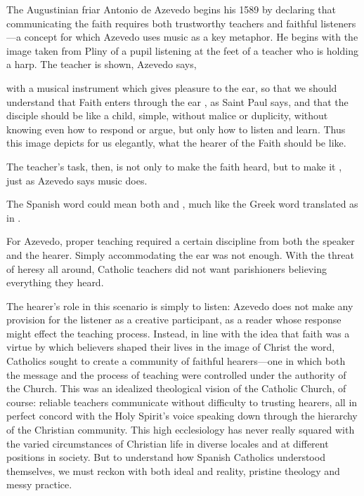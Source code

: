 The Augustinian friar Antonio de Azevedo begins his 1589  by declaring that communicating the faith requires
both trustworthy teachers and faithful listeners---a concept for which Azevedo
uses music as a key metaphor.%
    \Autocite{Azevedo:Catecismo}
He begins with the image taken from Pliny of a pupil listening at the feet of a
teacher who is holding a harp.
The teacher is shown, Azevedo says,
\begin{quoting}
    with a musical instrument which gives pleasure to the ear, so that we should
    understand that Faith enters through the ear , as Saint Paul
    says, and that the disciple should be like a child, simple, without malice
    or duplicity, without knowing even how to respond or argue, but only how to
    listen and learn.
    Thus this image depicts for us elegantly, what the hearer of the Faith
    should be like.%
        \Autocite[]{Azevedo:Catecismo}
\end{quoting}
The teacher's task, then, is not only to make the faith heard, but to make it
, just as Azevedo says music does.%
\begin{Footnote}
    The Spanish word  could mean both  and
    , much like the Greek word  translated as
     in .
\end{Footnote}
For Azevedo, proper teaching required a certain discipline from both the speaker
and the hearer.
Simply accommodating the ear was not enough.
With the threat of heresy all around, Catholic teachers did not want
parishioners believing everything they heard.

The hearer's role in this scenario is simply to listen: Azevedo does not make
any provision for the listener as a creative participant, as a reader whose
response might effect the teaching process.
Instead, in line with the idea that faith was a virtue by which believers shaped
their lives in the image of Christ the word, Catholics sought to create a
community of faithful hearers---one in which both the message and the process of
teaching were controlled under the authority of the Church.
This was an idealized theological vision of the Catholic Church, of course:
reliable teachers communicate without difficulty to trusting hearers, all in
perfect concord with the Holy Spirit's voice speaking down through the hierarchy
of the Christian community.
This high ecclesiology has never really squared with the varied circumstances of
Christian life in diverse locales and at different positions in society.
But to understand how Spanish Catholics understood themselves, we must reckon
with both ideal and reality, pristine theology and messy practice.

